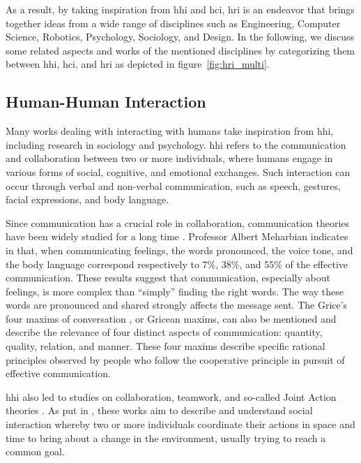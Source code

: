 As a result, by taking inspiration from \acrfull{hhi} and \acrfull{hci}, \acrshort{hri} is an endeavor that brings together ideas from a wide range of disciplines such as Engineering, Computer Science, Robotics, Psychology, Sociology, and Design.
In the following, we discuss some related aspects and works of the mentioned disciplines by categorizing them between \acrshort{hhi}, \acrshort{hci}, and \acrshort{hri} as depicted in figure~\ref{fig:hri_multi}.

\subsection{Human-Human Interaction}

Many works dealing with interacting with humans take inspiration from \acrfull{hhi}, including research in sociology and psychology. \acrshort{hhi} refers to the communication and collaboration between two or more individuals, where humans engage in various forms of social, cognitive, and emotional exchanges. Such interaction can occur through verbal and non-verbal communication, such as speech, gestures, facial expressions, and body language.   

Since communication has a crucial role in collaboration, communication theories have been widely studied for a long time \cite{cherry_human_1957,smith_designing_1998}. Professor Albert Meharbian indicates in \cite{mehrabian1967decoding} that, when communicating feelings, the words pronounced, the voice tone, and the body language correspond respectively to 7\%, 38\%, and 55\% of the effective communication. These results suggest that communication, especially about feelings, is more complex than ``simply'' finding the right words. The way these words are pronounced and shared strongly affects the message sent. The Grice's four maxims of conversation \cite{grice1975logic}, or Gricean maxims, can also be mentioned and describe the relevance of four distinct aspects of communication: quantity, quality, relation, and manner. These four maxims describe specific rational principles observed by people who follow the cooperative principle in pursuit of effective communication.

\acrshort{hhi} also led to studies on collaboration, teamwork, and so-called Joint Action theories \cite{cohen_team_1970,levesque_acting_1990,cohen_teamwork_1991}. As put in \cite{sebanz_2006joint}, these works aim to describe and understand social interaction whereby two or more individuals coordinate their actions in space and time to bring about a change in the environment, usually trying to reach a common goal.

